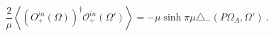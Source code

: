 \begin{equation}\label{eq1}
\frac{2}{\mu}\left<(O_{+}^{in}(\Omega))^{\dag}
\mathcal{O}_+^{in}(\Omega')\right>=-\mu\sinh\pi\mu
\triangle_-(P\Omega_A,\Omega') \ .
\end{equation}

